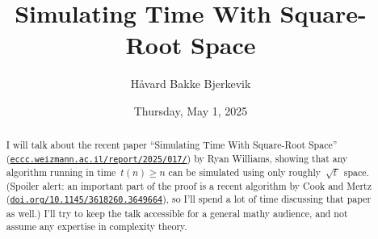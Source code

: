 \documentclass{UAmathtalk}
\author{Håvard Bakke Bjerkevik}
\title{Simulating Time With Square-Root Space}
\date{Thursday, May 1, 2025}
\begin{document}
\maketitle

\begin{abstract}
I will talk about the recent paper ``Simulating Time With Square-Root Space'' (\href{https://eccc.weizmann.ac.il/report/2025/017/}{\nolinkurl{eccc.weizmann.ac.il/report/2025/017/}}) by Ryan Williams, showing that any algorithm running in time~$t(n)\geq n$ can be simulated using only roughly~$\sqrt{t\,}$ space. (Spoiler alert: an important part of the proof is a recent algorithm by Cook and Mertz (\href{https://doi.org/10.1145/3618260.3649664}{\nolinkurl{doi.org/10.1145/3618260.3649664}}), so I'll spend a lot of time discussing that paper as well.) I'll try to keep the talk accessible for a general mathy audience, and not assume any expertise in complexity theory.
\end{abstract}
\end{document}
